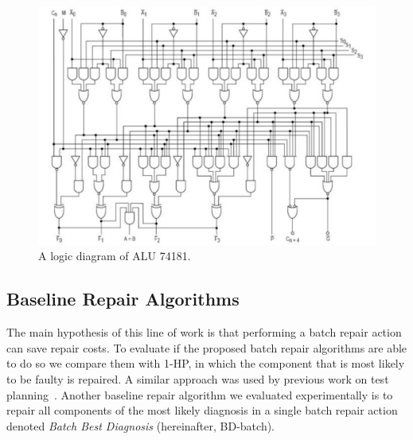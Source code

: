 \begin{figure}{}%
\begin{center}
  \includegraphics[width=0.9\columnwidth]{74181.pdf}
  \caption{A logic diagram of ALU 74181.}
  \label{fig:74181}
\end{center}
\end{figure}


\subsection{Baseline Repair Algorithms}

The main hypothesis of this line of work is that performing a batch repair action can save repair costs. To evaluate if the proposed batch repair algorithms are able to do so we compare them with 1-HP, in which the component that is most likely to be faulty is repaired. A similar approach was used by previous work on test planning~\cite{zamir2014using}. Another baseline repair algorithm we evaluated experimentally is to repair all components of the most likely diagnosis in a single batch repair action denoted {\em Batch Best Diagnosis} (hereinafter, BD-batch).

